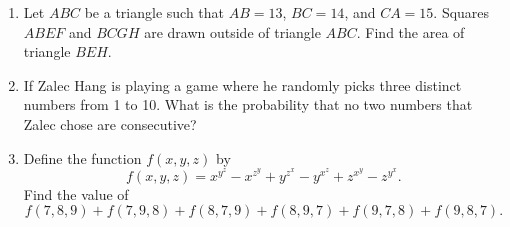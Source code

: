 \documentclass[11pt]{article}
\theoremstyle{definition}
\begin{document}
\begin{enumerate}
\item Let $ABC$ be a triangle such that $AB = 13$, $BC = 14$, and $CA = 15$. Squares $ABEF$ and $BCGH$ are drawn outside of triangle $ABC$. Find the area of triangle $BEH$.

\item If Zalec Hang is playing a game where he randomly picks three distinct numbers from 1 to 10. What is the probability that no two numbers that Zalec chose are consecutive?

\item Define the function $f(x, y, z)$ by\[f(x, y, z) = x^{y^z} - x^{z^y} + y^{z^x} - y^{x^z} + z^{x^y} - z^{y^x}.\]Find the value of\[f(7, 8, 9) + f(7, 9, 8) + f(8, 7, 9) + f(8, 9, 7) + f(9, 7, 8) + f(9, 8, 7).\]

\end{enumerate}


\eject
\end{document}
